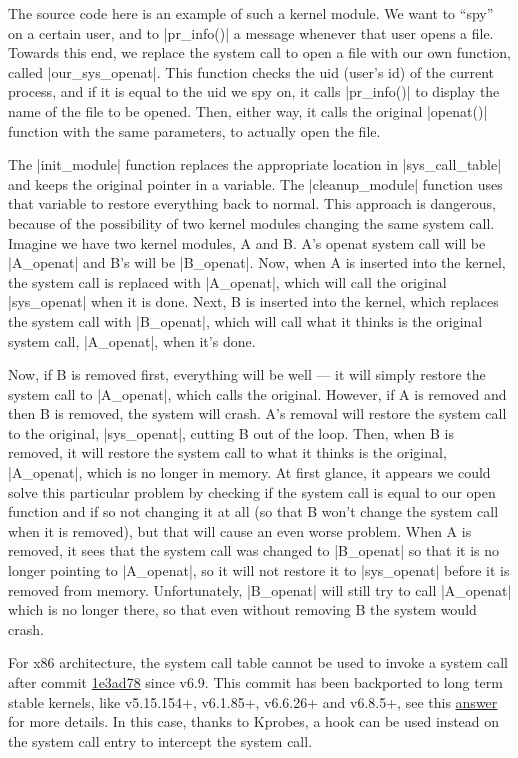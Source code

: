 \documentclass[10pt, oneside]{book}
\begin{document}
The source code here is an example of such a kernel module.
We want to ``spy'' on a certain user, and to \cpp|pr_info()| a message whenever that user opens a file.
Towards this end, we replace the system call to open a file with our own function, called \cpp|our_sys_openat|.
This function checks the uid (user's id) of the current process, and if it is equal to the uid we spy on, it calls \cpp|pr_info()| to display the name of the file to be opened.
Then, either way, it calls the original \cpp|openat()| function with the same parameters, to actually open the file.

The \cpp|init_module| function replaces the appropriate location in \cpp|sys_call_table| and keeps the original pointer in a variable.
The \cpp|cleanup_module| function uses that variable to restore everything back to normal.
This approach is dangerous, because of the possibility of two kernel modules changing the same system call.
Imagine we have two kernel modules, A and B. A's openat system call will be \cpp|A_openat| and B's will be \cpp|B_openat|.
Now, when A is inserted into the kernel, the system call is replaced with \cpp|A_openat|, which will call the original \cpp|sys_openat| when it is done.
Next, B is inserted into the kernel, which replaces the system call with \cpp|B_openat|, which will call what it thinks is the original system call, \cpp|A_openat|, when it's done.

Now, if B is removed first, everything will be well --- it will simply restore the system call to \cpp|A_openat|, which calls the original.
However, if A is removed and then B is removed, the system will crash.
A's removal will restore the system call to the original, \cpp|sys_openat|, cutting B out of the loop.
Then, when B is removed, it will restore the system call to what it thinks is the original, \cpp|A_openat|, which is no longer in memory.
At first glance, it appears we could solve this particular problem by checking if the system call is equal to our open function and if so not changing it at all (so that B won't change the system call when it is removed), but that will cause an even worse problem.
When A is removed, it sees that the system call was changed to \cpp|B_openat| so that it is no longer pointing to \cpp|A_openat|, so it will not restore it to \cpp|sys_openat| before it is removed from memory.
Unfortunately, \cpp|B_openat| will still try to call \cpp|A_openat| which is no longer there, so that even without removing B the system would crash.

For x86 architecture, the system call table cannot be used to invoke a system call after commit 
\href{https://git.kernel.org/pub/scm/linux/kernel/git/torvalds/linux.git/commit/?id=1e3ad78334a69b36e107232e337f9d693dcc9df2}{1e3ad78} since v6.9. 
This commit has been backported to long term stable kernels, like v5.15.154+, v6.1.85+, v6.6.26+ and v6.8.5+, see this \href{https://stackoverflow.com/a/78607015}{answer} for more details.
In this case, thanks to Kprobes, a hook can be used instead on the system call entry to intercept the system call.
\end{document}
